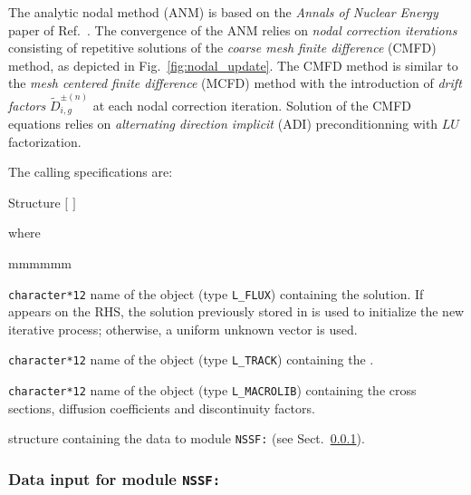 The analytic nodal method (ANM) is based on the {\sl Annals of Nuclear Energy} paper of Ref.~. The convergence of the ANM
relies on {\sl nodal correction iterations} consisting of repetitive solutions of the {\sl coarse mesh finite difference} (CMFD) method, as depicted in Fig.~\ref{fig:nodal_update}.
The CMFD method is similar to the {\sl mesh centered finite difference} (MCFD) method with the introduction of {\sl drift factors} $\tilde D_{i,g}^{\pm(n)}$ at each nodal correction
iteration. Solution of the CMFD equations relies on {\sl alternating direction implicit} (ADI) preconditionning with $LU$ factorization.

\goodbreak

The calling specifications are:

\begin{DataStructure}{Structure }
 \moc{:=}  $[$  $]$   \moc{::} 
\end{DataStructure}

\noindent where
\begin{ListeDeDescription}{mmmmmm}

\item[\dusa{FLUX}] {\tt character*12} name of the  object (type {\tt L\_FLUX}) containing the solution. If  appears on the RHS, the solution previously stored in 
is used to initialize the new iterative process; otherwise, a uniform unknown vector is used.

\item[\dusa{TRACK}] {\tt character*12} name of the  object (type {\tt L\_TRACK}) containing the .

\item[\dusa{MACRO}] {\tt character*12} name of the  object (type {\tt L\_MACROLIB}) containing the cross sections, diffusion coefficients and discontinuity
factors.

\item[\dstr{NSSF\_data}] structure containing the data to module {\tt NSSF:} (see Sect.~\ref{sect:nssf_data}).

\end{ListeDeDescription}

\vskip 0.2cm

\subsubsection{Data input for module {\tt NSSF:}}\label{sect:nssf_data}

